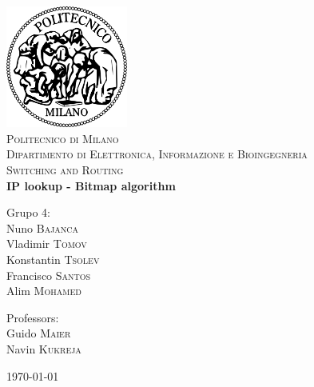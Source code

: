 \begin{titlepage}
\begin{center}

\includegraphics[width=0.3\textwidth]{./LogoPolimi.png}~\\[1cm]

\textsc{\LARGE Politecnico di Milano}\\[1cm]
\textsc{\LARGE Dipartimento di Elettronica, Informazione e Bioingegneria}\\[1.5 cm]




\textsc{\Large Switching and Routing}\\[1cm]

{ \huge \bfseries IP lookup - Bitmap algorithm \\[1.5cm] }

\begin{texto}[6cm]
Grupo 4:\\
Nuno \textsc{Bajanca}\\
Vladimir  \textsc{Tomov}\\
Konstantin  \textsc{Tsolev}\\
Francisco  \textsc{Santos}\\
Alim  \textsc{Mohamed}\\
\end{texto}

\begin{texto}[6cm]
Professors:\\
Guido \textsc{Maier}\\
Navin   \textsc{Kukreja}\\
\end{texto}


\vfill

{\large \today}

\end{center}
\end{titlepage}